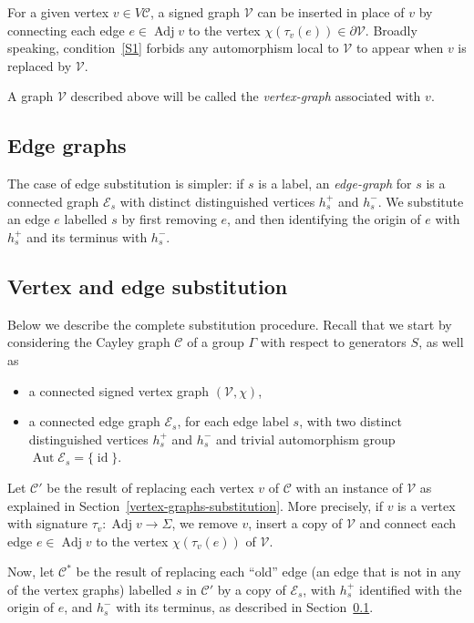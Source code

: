 \documentclass[ALCO,ThmDefs,Unicode,epreuves]{cedram}
\newcommand{\cC}{\mathcal{C}}
\newcommand{\cV}{\mathcal{V}}
\newcommand{\cE}{\mathcal{E}}
\DeclareMathOperator{\aut}{Aut}
\DeclareMathOperator{\adj}{Adj}
\DeclareMathOperator{\id}{id}
\begin{document}
For a given vertex $v \in V\cC$, a signed graph $\cV$ can be inserted in place of $v$ by connecting each edge $e \in \adj v$ to the vertex ${\chi}({\tau}_v(e)) \in {\partial}\cV$. Broadly speaking, condition~\ref{S1} forbids any automorphism local to $\cV$ to appear when $v$ is replaced by $\cV$.

A graph $\cV$ described above will be called the \emph{vertex-graph} associated with $v$.

\subsection{Edge graphs}\label{edge-graphs-substitution}

The case of edge substitution is simpler: if $s$ is a label, an \emph{edge-graph} for $s$ is a connected graph $\cE_s$ with distinct distinguished vertices $h^{+}_s$ and $h^{-}_s$. We substitute an edge $e$ labelled $s$ by first removing $e$, and then identifying the origin of $e$ with $h^{+}_s$ and its terminus with $h^{-}_s$.

\subsection{Vertex and edge substitution}\label{sssection:substitution}
 
Below we describe the complete substitution procedure. Recall that we start by considering the Cayley graph $\cC$ of a group $\Gamma$ with respect to generators $S$, as well as 
\begin{itemize}
\item a connected signed vertex graph $(\cV,{\chi})$, 
\item a connected edge graph $\cE_s$, for each edge label $s$, with two distinct distinguished vertices $h_s^{+}$ and $h_s^{-}$ and trivial automorphism group $\aut \cE_s = \{\id \}$.
\end{itemize}
 
Let $\cC'$ be the result of replacing each vertex $v$ of $\cC$ with an instance of $\cV$ as explained in Section~\ref{vertex-graphs-substitution}. More precisely, if $v$ is a vertex with signature ${\tau}_v:\adj v \to {\Sigma}$, we remove $v$, insert a copy of $\cV$ and connect each edge $e\in \adj v$ to the vertex ${\chi}({\tau}_v(e))$ of $\cV$.

Now, let $\cC^*$ be the result of replacing each ``old'' edge (\ie an edge that is not in any of the vertex graphs) labelled $s$ in $\cC'$ by a copy of $\cE_s$, with $h_s^{+}$ identified with the origin of $e$, and $h_s^{-}$ with its terminus, as described in Section~\ref{edge-graphs-substitution}.
\end{document}
